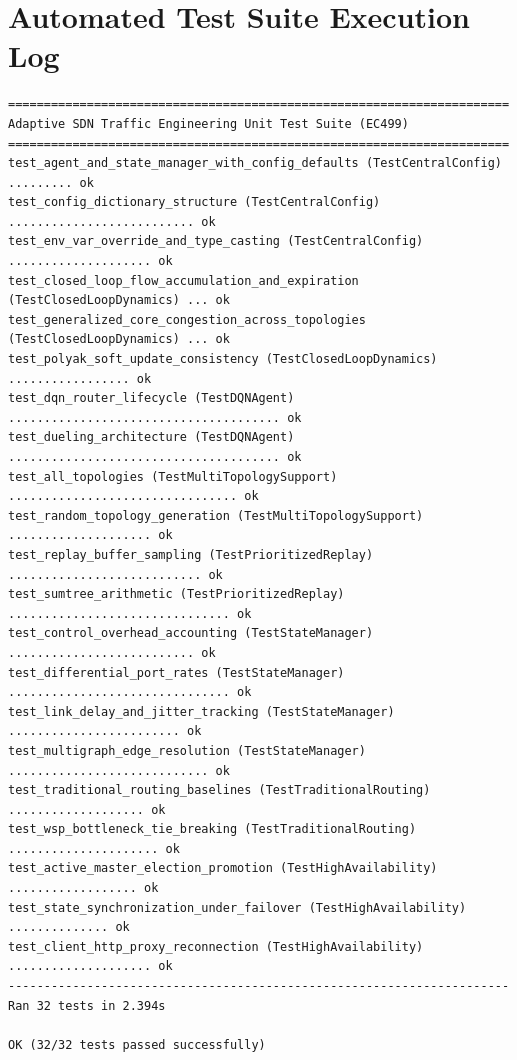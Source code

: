 \documentclass[12pt,a4paper,oneside]{report}
\begin{document}
\section{Automated Test Suite Execution Log}
\begin{lstlisting}
======================================================================
Adaptive SDN Traffic Engineering Unit Test Suite (EC499)
======================================================================
test_agent_and_state_manager_with_config_defaults (TestCentralConfig) ......... ok
test_config_dictionary_structure (TestCentralConfig) .......................... ok
test_env_var_override_and_type_casting (TestCentralConfig) .................... ok
test_closed_loop_flow_accumulation_and_expiration (TestClosedLoopDynamics) ... ok
test_generalized_core_congestion_across_topologies (TestClosedLoopDynamics) ... ok
test_polyak_soft_update_consistency (TestClosedLoopDynamics) ................. ok
test_dqn_router_lifecycle (TestDQNAgent) ...................................... ok
test_dueling_architecture (TestDQNAgent) ...................................... ok
test_all_topologies (TestMultiTopologySupport) ................................ ok
test_random_topology_generation (TestMultiTopologySupport) .................... ok
test_replay_buffer_sampling (TestPrioritizedReplay) ........................... ok
test_sumtree_arithmetic (TestPrioritizedReplay) ............................... ok
test_control_overhead_accounting (TestStateManager) .......................... ok
test_differential_port_rates (TestStateManager) ............................... ok
test_link_delay_and_jitter_tracking (TestStateManager) ........................ ok
test_multigraph_edge_resolution (TestStateManager) ............................ ok
test_traditional_routing_baselines (TestTraditionalRouting) ................... ok
test_wsp_bottleneck_tie_breaking (TestTraditionalRouting) ..................... ok
test_active_master_election_promotion (TestHighAvailability) .................. ok
test_state_synchronization_under_failover (TestHighAvailability) .............. ok
test_client_http_proxy_reconnection (TestHighAvailability) .................... ok
----------------------------------------------------------------------
Ran 32 tests in 2.394s

OK (32/32 tests passed successfully)
\end{lstlisting}
\end{document}
